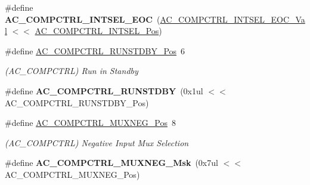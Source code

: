 \begin{DoxyCompactItemize}
\item 
\hypertarget{group___s_a_m_l21___a_c_ga7770e554685fc4587b354bc88715e8d8}{}\#define {\bfseries A\+C\+\_\+\+C\+O\+M\+P\+C\+T\+R\+L\+\_\+\+I\+N\+T\+S\+E\+L\+\_\+\+E\+O\+C}~(\hyperlink{group___s_a_m_l21___a_c_gad5b505d36ebe43b2bd56cc421c3f4ff7}{A\+C\+\_\+\+C\+O\+M\+P\+C\+T\+R\+L\+\_\+\+I\+N\+T\+S\+E\+L\+\_\+\+E\+O\+C\+\_\+\+Val}    $<$$<$ \hyperlink{group___s_a_m_l21___a_c_gaf17b8514f92bb9fa7999607938ab4994}{A\+C\+\_\+\+C\+O\+M\+P\+C\+T\+R\+L\+\_\+\+I\+N\+T\+S\+E\+L\+\_\+\+Pos})\label{group___s_a_m_l21___a_c_ga7770e554685fc4587b354bc88715e8d8}

\item 
\hypertarget{group___s_a_m_l21___a_c_ga209a69c0a7c751dc9e096044568b9ebd}{}\#define \hyperlink{group___s_a_m_l21___a_c_ga209a69c0a7c751dc9e096044568b9ebd}{A\+C\+\_\+\+C\+O\+M\+P\+C\+T\+R\+L\+\_\+\+R\+U\+N\+S\+T\+D\+B\+Y\+\_\+\+Pos}~6\label{group___s_a_m_l21___a_c_ga209a69c0a7c751dc9e096044568b9ebd}

\begin{DoxyCompactList}\small\item\em (A\+C\+\_\+\+C\+O\+M\+P\+C\+T\+R\+L) Run in Standby \end{DoxyCompactList}\item 
\hypertarget{group___s_a_m_l21___a_c_ga13816a1c0c5aabe43e1b60ca600816f5}{}\#define {\bfseries A\+C\+\_\+\+C\+O\+M\+P\+C\+T\+R\+L\+\_\+\+R\+U\+N\+S\+T\+D\+B\+Y}~(0x1ul $<$$<$ A\+C\+\_\+\+C\+O\+M\+P\+C\+T\+R\+L\+\_\+\+R\+U\+N\+S\+T\+D\+B\+Y\+\_\+\+Pos)\label{group___s_a_m_l21___a_c_ga13816a1c0c5aabe43e1b60ca600816f5}

\item 
\hypertarget{group___s_a_m_l21___a_c_gae66ccdb1fdce71c5b35d4acf2dcd5234}{}\#define \hyperlink{group___s_a_m_l21___a_c_gae66ccdb1fdce71c5b35d4acf2dcd5234}{A\+C\+\_\+\+C\+O\+M\+P\+C\+T\+R\+L\+\_\+\+M\+U\+X\+N\+E\+G\+\_\+\+Pos}~8\label{group___s_a_m_l21___a_c_gae66ccdb1fdce71c5b35d4acf2dcd5234}

\begin{DoxyCompactList}\small\item\em (A\+C\+\_\+\+C\+O\+M\+P\+C\+T\+R\+L) Negative Input Mux Selection \end{DoxyCompactList}\item 
\hypertarget{group___s_a_m_l21___a_c_ga4b10bd59a25c031b861766423d22d275}{}\#define {\bfseries A\+C\+\_\+\+C\+O\+M\+P\+C\+T\+R\+L\+\_\+\+M\+U\+X\+N\+E\+G\+\_\+\+Msk}~(0x7ul $<$$<$ A\+C\+\_\+\+C\+O\+M\+P\+C\+T\+R\+L\+\_\+\+M\+U\+X\+N\+E\+G\+\_\+\+Pos)\label{group___s_a_m_l21___a_c_ga4b10bd59a25c031b861766423d22d275}


\end{DoxyCompactItemize}
